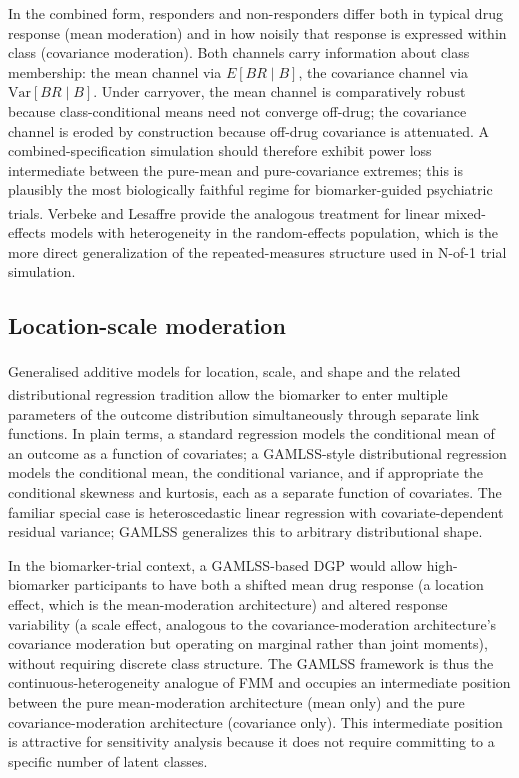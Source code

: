 \documentclass[
  11pt,
]{article}
\begin{document}
In the combined form, responders and non-responders differ both in
typical drug response (mean moderation) and in how noisily that
response is expressed within class (covariance moderation). Both
channels carry information about class membership: the mean channel via
\(E[BR \mid B]\), the covariance channel via \(\mathrm{Var}[BR \mid B]\).
Under carryover, the mean channel is comparatively robust because
class-conditional means need not converge off-drug; the covariance
channel is eroded by construction because off-drug covariance is
attenuated. A combined-specification simulation should therefore
exhibit power loss intermediate between the pure-mean and
pure-covariance extremes; this is plausibly the most biologically
faithful regime for biomarker-guided psychiatric trials. Verbeke and
Lesaffre\textsuperscript{} provide the analogous treatment for
linear mixed-effects models with heterogeneity in the random-effects
population, which is the more direct generalization of the
repeated-measures structure used in N-of-1 trial simulation.

\subsection{Location-scale moderation}\label{location-scale-moderation}

Generalised additive models for location, scale, and shape\textsuperscript{} and the related distributional regression tradition\textsuperscript{} allow the biomarker to enter multiple parameters of the
outcome distribution simultaneously through separate link functions. In
plain terms, a standard regression models the conditional mean of an
outcome as a function of covariates; a GAMLSS-style distributional
regression models the conditional mean, the conditional variance, and
if appropriate the conditional skewness and kurtosis, each as a
separate function of covariates. The familiar special case is
heteroscedastic linear regression with covariate-dependent residual
variance; GAMLSS generalizes this to arbitrary distributional shape.

In the biomarker-trial context, a GAMLSS-based DGP would allow
high-biomarker participants to have both a shifted mean drug response
(a location effect, which is the mean-moderation architecture) and
altered response variability (a scale effect, analogous to the
covariance-moderation architecture's covariance moderation but
operating on marginal rather than joint moments), without requiring
discrete class structure. The GAMLSS framework is thus the
continuous-heterogeneity analogue of FMM and occupies an intermediate
position between the pure mean-moderation architecture (mean only) and
the pure covariance-moderation architecture (covariance only). This
intermediate position is attractive for sensitivity analysis because
it does not require committing to a specific number of latent classes.
\end{document}
